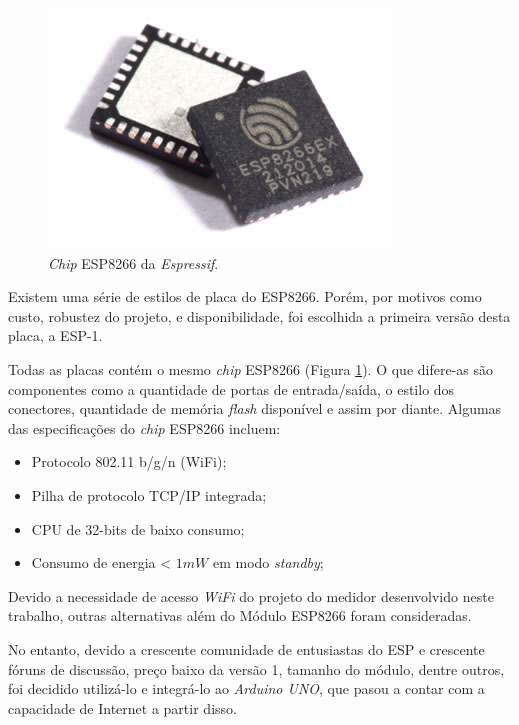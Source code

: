 \documentclass[
    12pt,               %
    openright,          %
    oneside,
    a4paper,            
    english,            %
    brazil              %
    ]{abntex2}
\begin{document}
\begin{figure}[!htb]
  \begin{center}
    \caption{\label{esp-chip}\textit{Chip} ESP8266 da \textit{Espressif}.}
    \includegraphics[scale=0.4]{images/esp-chip-2.jpg}
  \end{center}
\end{figure}

Existem uma série de estilos de placa do ESP8266. Porém, por motivos como custo, robustez  do projeto, e disponibilidade, foi escolhida a primeira versão desta placa, a ESP-1. 

Todas as placas contém o mesmo \textit{chip} ESP8266 (Figura \ref{esp-chip}). O que difere-as são componentes como a quantidade de portas de entrada/saída, o estilo dos conectores, quantidade de memória \textit{flash} disponível e assim por diante. Algumas das especificações do \textit{chip} ESP8266 incluem:

\begin{itemize}
  \item Protocolo 802.11 b/g/n (WiFi);
  \item Pilha de protocolo TCP/IP integrada;
  \item CPU de 32-bits de baixo consumo;
  \item Consumo de energia < $1mW$ em modo \textit{standby}; 
\end{itemize}

Devido a necessidade de acesso \textit{WiFi} do projeto do medidor desenvolvido neste trabalho, outras alternativas além do Módulo ESP8266 foram consideradas. 

No entanto, devido a crescente comunidade de entusiastas do ESP e crescente fóruns de discussão, preço baixo da versão 1, tamanho do módulo, dentre outros, foi decidido utilizá-lo e integrá-lo ao \textit{Arduino UNO}, que pasou a contar com a capacidade de Internet a partir disso. 
\end{document}
